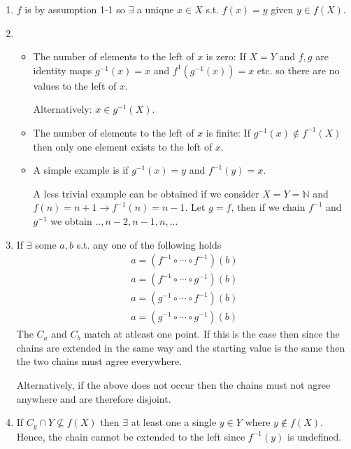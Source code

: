 \begin{enumerate}[label=(\alph*)]
    \item 
    $f$ is by assumption 1-1 so $\exists$ a unique $x\in X$ s.t. $f(x)=y$ given $y\in f(X)$.

    \item 
    \begin{itemize}
        \item 
        The number of elements to the left of $x$ is zero: 
        If $X=Y$ and $f, g$ are identity maps $g^{-1}(x)=x$ and $f^{1}(g^{-1}(x))=x$ etc. so
        there are no values to the left of $x$.

        Alternatively: $x\in g^{-1}(X)$.

        \item 
        The number of elements to the left of $x$ is finite: 
        If $g^{-1}(x) \not\in f^{-1}(X)$ then only one element exists to the left of $x$.

        \item 
        A simple example is if $g^{-1}(x) = y$ and $f^{-1}(y) = x$.
        
        A less trivial example can be obtained if we consider $X=Y=\mathbb{N}$ and 
        $f(n) = n+1 \rightarrow f^{-1}(n)=n-1$. Let $g=f$, then if we chain $f^{-1}$ and 
        $g^{-1}$ we obtain $..,n-2, n-1, n, ...$
    \end{itemize}

    \item 
    If $\exists$ some $a, b$ s.t. any one of the following holds
    \begin{gather*}
        a = (f^{-1} \circ \cdots \circ f^{-1})(b) \\
        a = (f^{-1} \circ \cdots \circ g^{-1})(b) \\
        a = ( g^{-1} \circ \cdots  \circ f^{-1})(b) \\
        a = ( g^{-1} \circ \cdots \circ g^{-1} )(b)
    \end{gather*}
    The $C_a$ and $C_b$ match at atleast one point. If this is the case then since
    the chains are extended in the same way and the starting value is the same then 
    the two chains must agree everywhere.

    Alternatively, if the above does not occur then the chains must not agree anywhere
    and are therefore disjoint.

    \item
    If $C_y \cap Y\not\subseteq f(X)$ then $\exists$ at least one a single $y\in Y$ where
    $y \not\in f(X)$. Hence, the chain cannot be extended to the left since $f^{-1}(y)$
    is undefined.


\end{enumerate}
